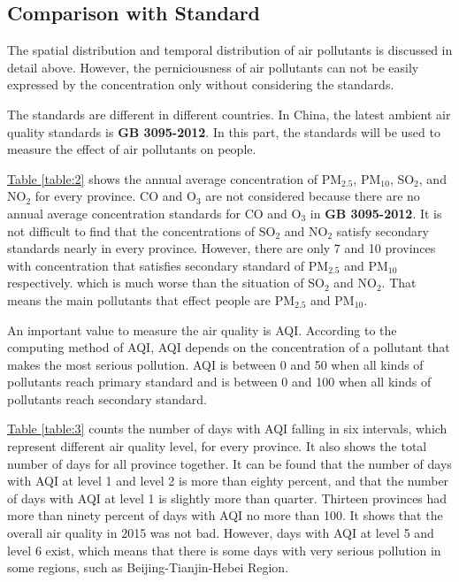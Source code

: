 \documentclass[letterpaper]{article}
\begin{document}
\begin{CJK*}{UTF8}{gkai}
  \section{Comparison with Standard}

  The spatial distribution and temporal distribution of air pollutants is discussed in detail above. However, the perniciousness of air pollutants can not be easily expressed by the concentration only without considering the standards.

  The standards are different in different countries. In China, the latest ambient air quality standards is \textbf{GB 3095-2012}. In this part, the standards will be used to measure the effect of air pollutants on people.

  \hyperref[table:2]{Table \ref*{table:2}} shows the annual average concentration of PM$_{2.5}$, PM$_{10}$, SO$_{2}$, and NO$_{2}$ for every province. CO and O$_{3}$ are not considered because there are no annual average concentration standards for CO and O$_{3}$ in \textbf{GB 3095-2012}. It is not difficult to find that the concentrations of SO$_{2}$ and NO$_{2}$ satisfy secondary standards nearly in every province. However, there are only 7 and 10 provinces with concentration that satisfies secondary standard of PM$_{2.5}$ and PM$_{10}$ respectively. which is much worse than the situation of SO$_{2}$ and NO$_{2}$. That means the main pollutants that effect people are PM$_{2.5}$ and PM$_{10}$.

  An important value to measure the air quality is AQI. According to the computing method of AQI, AQI depends on the concentration of a pollutant that makes the most serious pollution. AQI is between 0 and 50 when all kinds of pollutants reach primary standard and is between 0 and 100 when all kinds of pollutants reach secondary standard.

  \hyperref[table:3]{Table \ref*{table:3}} counts the number of days with AQI falling in six intervals, which represent different air quality level, for every province. It also shows the total number of days for all province together. It can be found that the number of days with AQI at level 1 and level 2 is more than eighty percent, and that the number of days with AQI at level 1 is slightly more than quarter. Thirteen provinces had more than ninety percent of days with AQI no more than 100. It shows that the overall air quality in 2015 was not bad. However, days with AQI at level 5 and level 6 exist, which means that there is some days with very serious pollution in some regions, such as Beijing-Tianjin-Hebei Region.


\end{CJK*}
\end{document}
